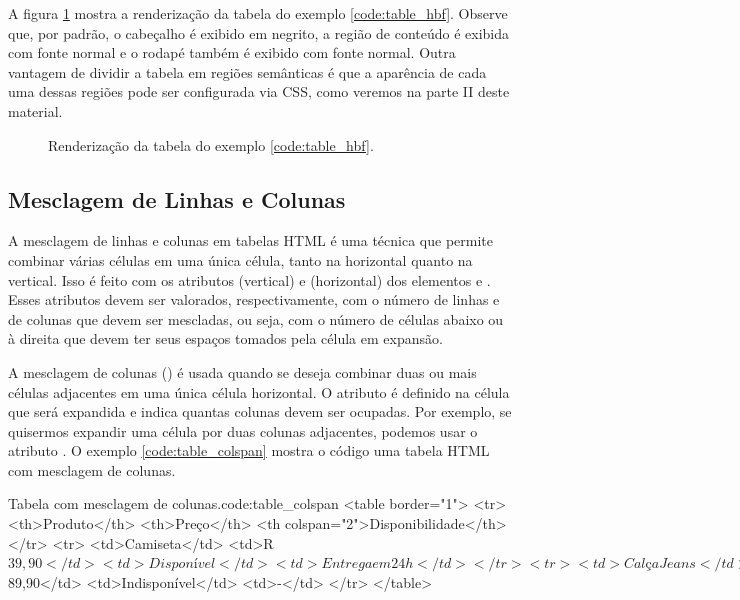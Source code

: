 A figura \ref{fig:table_hbf} mostra a renderização da tabela do exemplo \ref{code:table_hbf}. Observe que, por padrão, o cabeçalho é exibido em negrito, a região de conteúdo é exibida com fonte normal e o rodapé também é exibido com fonte normal. Outra vantagem de dividir a tabela em regiões semânticas é que a aparência de cada uma dessas regiões pode ser configurada via CSS, como veremos na parte II deste material.

\begin{figure}[ht!]    
    \caption{Renderização da tabela do exemplo \ref{code:table_hbf}.}
    \label{fig:table_hbf}
\end{figure}

\subsection{Mesclagem de Linhas e Colunas}

A mesclagem de linhas e colunas em tabelas HTML é uma técnica que permite combinar várias células em uma única célula, tanto na horizontal quanto na vertical. Isso é feito com os atributos  (vertical) e  (horizontal) dos elementos  e . Esses atributos devem ser valorados, respectivamente, com o número de linhas e de colunas que devem ser mescladas, ou seja, com o número de células abaixo ou à direita que devem ter seus espaços tomados pela célula em expansão.

A mesclagem de colunas () é usada quando se deseja combinar duas ou mais células adjacentes em uma única célula horizontal. O atributo  é definido na célula que será expandida e indica quantas colunas devem ser ocupadas. Por exemplo, se quisermos expandir uma célula por duas colunas adjacentes, podemos usar o atributo . O exemplo \ref{code:table_colspan} mostra o código uma tabela HTML com mesclagem de colunas.

\begin{htmlcode}{Tabela com mesclagem de colunas.}{code:table_colspan}
<table border="1">
    <tr>
        <th>Produto</th>
        <th>Preço</th>
        <th colspan="2">Disponibilidade</th>
    </tr>
    <tr>
        <td>Camiseta</td>
        <td>R$ 39,90</td>
        <td>Disponível</td>
        <td>Entrega em 24h</td>
    </tr>
    <tr>
        <td>Calça Jeans</td>
        <td>R$ 89,90</td>
        <td>Indisponível</td>
        <td>-</td>
    </tr>
</table>
\end{htmlcode}

